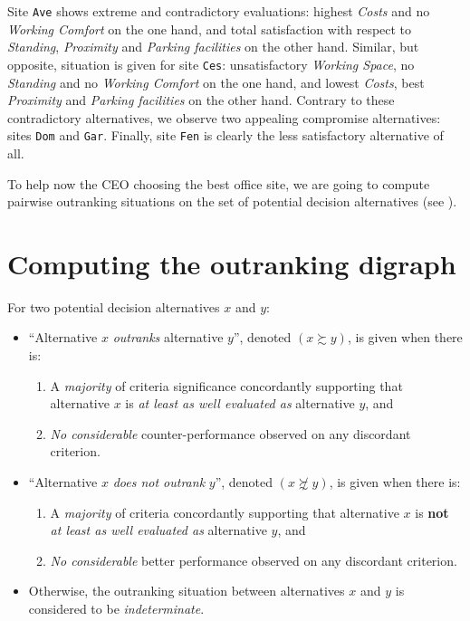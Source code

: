 Site \texttt{Ave} shows extreme and contradictory evaluations: highest \emph{Costs} and no \emph{Working Comfort} on the one hand, and total satisfaction with respect to \emph{Standing}, \emph{Proximity} and \emph{Parking facilities} on the other hand. Similar, but opposite, situation is given for site \texttt{Ces}: unsatisfactory \emph{Working Space}, no \emph{Standing} and no \emph{Working Comfort} on the one hand, and lowest \emph{Costs}, best \emph{Proximity} and \emph{Parking facilities} on the other hand. Contrary to these contradictory alternatives, we observe two appealing compromise alternatives: sites \texttt{Dom} and \texttt{Gar}. Finally, site \texttt{Fen} is clearly the less satisfactory alternative of all.

To help now the CEO choosing the best office site, we are going to compute pairwise outranking situations on the set of potential decision alternatives (see \citealp{BIS-2013}).

\section{Computing the outranking digraph}
\label{sec:4.3}

\begin{definition}\label{def:outranking}

\noindent For two potential decision alternatives $x$ and $y$:
\begin{itemize}[leftmargin=0.5cm,rightmargin=0.5cm]
\item ``Alternative $x$ \emph{outranks} alternative $y$'', denoted $(x \succsim y)$, is given when there is:
   \begin{enumerate}
     \item A \emph{majority} of criteria significance concordantly supporting that alternative $x$ is \emph{at least as well evaluated as} alternative $y$, and
     \item \emph{No considerable} counter-performance observed on any discordant criterion.      
    \end{enumerate}
\item ``Alternative $x$ \emph{does not outrank} $y$'', denoted $(x \not\succsim y)$, is given when there is:
   \begin{enumerate}
    \item A \emph{majority} of criteria concordantly supporting that alternative $x$ is \textbf{not} \emph{at least as well evaluated as} alternative $y$, and
    \item \emph{No considerable} better performance observed on any discordant criterion. 
    \end{enumerate}
\item Otherwise, the outranking situation between alternatives $x$ and $y$ is considered to be \emph{indeterminate}.
\end{itemize}
\end{definition}

